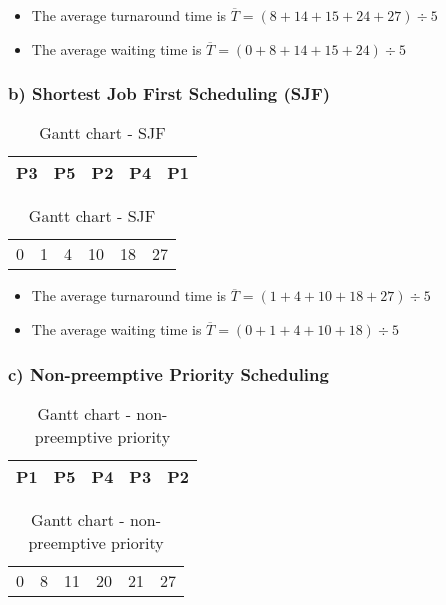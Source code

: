 \documentclass[11pt]{article}
\begin{document}
\begin{itemize}
    \item The average turnaround time is $\overline T = (8 + 14 + 15 + 24 + 27) \div 5 $
    \item The average waiting time is $\overline T = (0 + 8 + 14 + 15 + 24) \div 5 $
\end{itemize}

\subsubsection*{b) Shortest Job First Scheduling (SJF)} 

\begin{table}[!htp]
    \centering            %
    \def\arraystretch{2}  %
    
    \begin{tabular}{|m{0.5cm}|m{1.5cm}|m{3cm}|m{4cm}|m{4.5cm}|}
        \hline
        P3 & P5 & P2 & P4 & P1 \\
        \hline
    \end{tabular}

    \begin{tabular}{m{0.5cm} m{1.5cm} m{3cm} m{4cm} m{4.5cm} l}
        0 & 1 & 4 & 10 & 18 & 27 \\
    \end{tabular}
    
    \caption{Gantt chart - SJF}
\end{table}

\begin{itemize}
    \item The average turnaround time is $\overline T = (1 + 4 + 10 + 18 + 27) \div 5 $
    \item The average waiting time is $\overline T = (0 + 1 + 4 + 10 + 18) \div 5 $
\end{itemize}

\newpage

\subsubsection*{c) Non-preemptive Priority Scheduling}

\begin{table}[!htp]
    \centering            %
    \def\arraystretch{2}  %
    
    \begin{tabular}{|m{4cm}|m{1.5cm}|m{4.5cm}|m{0.5cm}|m{3cm}|}
        \hline
        P1 & P5 & P4 & P3 & P2 \\
        \hline
    \end{tabular}

    \begin{tabular}{m{4cm}m{1.5cm}m{4.5cm}m{0.5cm}m{3cm} l}
        0 & 8 & 11 & 20 & 21 & 27 \\
    \end{tabular}
    
    \caption{Gantt chart - non-preemptive priority}
\end{table}
\end{document}
